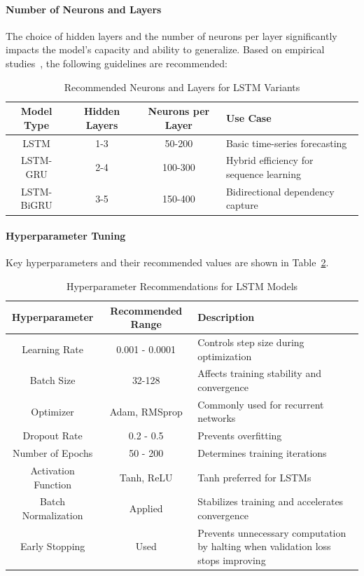 \paragraph{Number of Neurons and Layers} The choice of hidden layers and the number of neurons per 
layer significantly impacts the model’s capacity and ability to generalize. Based on empirical 
studies~\parencite{chang2024StockPrediction, nabipour2020DeepLearning}, 
the following guidelines are recommended:

\begin{table}[H]
\centering
\caption{Recommended Neurons and Layers for LSTM Variants}
\label{table:neurons_layers}
\begin{tabular}{cccp{5cm}}
\hline
\textbf{Model Type} & \textbf{Hidden Layers} & \textbf{Neurons per Layer} & \textbf{Use Case} \\ \hline\hline
LSTM & 1-3 & 50-200 & Basic time-series forecasting \\
LSTM-GRU & 2-4 & 100-300 & Hybrid efficiency for sequence learning \\
LSTM-BiGRU & 3-5 & 150-400 & Bidirectional dependency capture \\
\hline
\end{tabular}
\end{table}

\paragraph{Hyperparameter Tuning}
Key hyperparameters and their recommended values are shown in Table~\ref{table:hyperparams}.

\begin{table}[H]
\centering
\caption{Hyperparameter Recommendations for LSTM Models}
\label{table:hyperparams}
\begin{tabular}{ccp{6.5cm}}
\hline
\textbf{Hyperparameter} & \textbf{Recommended Range} & \textbf{Description} \\ \hline\hline
Learning Rate & 0.001 - 0.0001 & Controls step size during optimization~\parencite{parmar2018stock} \\
Batch Size & 32-128 & Affects training stability and convergence \\
Optimizer & Adam, RMSprop & Commonly used for recurrent networks \\
Dropout Rate & 0.2 - 0.5 & Prevents overfitting~\parencite{agrawal2022StockPrediction} \\
Number of Epochs & 50 - 200 & Determines training iterations \\
Activation Function & Tanh, ReLU & Tanh preferred for LSTMs \\
Batch Normalization & Applied & Stabilizes training and accelerates 
convergence~\parencite{balasubramanian2023SystematicSurvey} \\
Early Stopping & Used & Prevents unnecessary computation by halting when validation loss 
stops improving~\parencite{chang2024StockPrediction} \\
\hline
\end{tabular}
\end{table}

